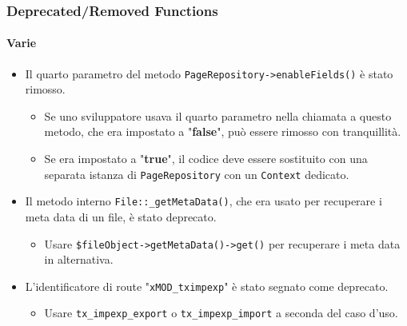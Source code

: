\begin{frame}[fragile]
	\frametitle{Deprecated/Removed Functions}
	\framesubtitle{Varie}

	\begin{itemize}

		\item Il quarto parametro del metodo \texttt{PageRepository->enableFields()} è stato rimosso.

		\begin{itemize}\smaller
			\item[\ding{228}] Se uno sviluppatore usava il quarto parametro nella chiamata a questo metodo, che era impostato a "\textbf{false}", può essere rimosso con tranquillità.
			\item[\ding{228}] Se era impostato a "\textbf{true}", il codice deve essere sostituito con una separata istanza di \texttt{PageRepository} con un \texttt{Context} dedicato.
		\end{itemize}\normalsize

		\item Il metodo interno \texttt{File::\_getMetaData()}, che era usato per recuperare i meta data di un file,
			è stato deprecato.

			\begin{itemize}\smaller
				\item[\ding{228}] Usare \texttt{\$fileObject->getMetaData()->get()} per recuperare i meta data in alternativa.
			\end{itemize}\normalsize

		\item L'identificatore di route "\texttt{xMOD\_tximpexp}" è stato segnato come deprecato.

			\begin{itemize}\smaller
				\item[\ding{228}] Usare \texttt{tx\_impexp\_export} o \texttt{tx\_impexp\_import} a seconda del caso d'uso.
			\end{itemize}\normalsize

	\end{itemize}

\end{frame}


